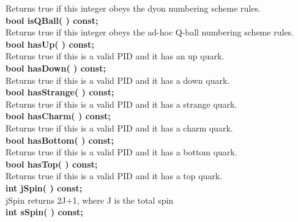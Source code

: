\begin{tabbing}
\hspace{1.0in}  Returns true if this integer obeys the dyon numbering scheme rules. \\
\hspace{0.5in}  {\bf bool isQBall( )  const; }\\
\hspace{1.0in}  Returns true if this integer obeys the ad-hoc Q-ball numbering scheme rules. \\
\hspace{0.5in}  {\bf bool hasUp( )      const; }\\
\hspace{1.0in}  Returns true if this is a valid PID and it has an up quark. \\
\hspace{0.5in}  {\bf bool hasDown( )    const; }\\
\hspace{1.0in}  Returns true if this is a valid PID and it has a down quark.\\
\hspace{0.5in}  {\bf bool hasStrange( ) const; }\\
\hspace{1.0in}  Returns true if this is a valid PID and it has a strange quark.\\
\hspace{0.5in}  {\bf bool hasCharm( )   const; }\\
\hspace{1.0in}  Returns true if this is a valid PID and it has a charm quark.\\
\hspace{0.5in}  {\bf bool hasBottom( )  const; }\\
\hspace{1.0in}  Returns true if this is a valid PID and it has a bottom quark.\\
\hspace{0.5in}  {\bf bool hasTop( )     const; }\\
\hspace{1.0in}  Returns true if this is a valid PID and it has a top quark.\\
\hspace{0.5in}  {\bf int  jSpin( )        const; }\\
\hspace{1.0in}  jSpin returns 2J+1, where J is the total spin \\
\hspace{0.5in}  {\bf int  sSpin( )        const; }\\

\end{tabbing}
